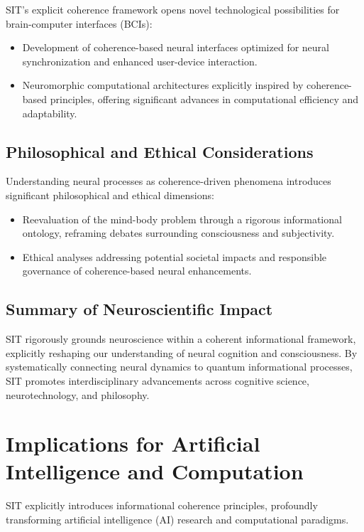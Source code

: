 SIT's explicit coherence framework opens novel technological possibilities for brain-computer interfaces (BCIs):

\begin{itemize}
\item Development of coherence-based neural interfaces optimized for neural synchronization and enhanced user-device interaction.
\item Neuromorphic computational architectures explicitly inspired by coherence-based principles, offering significant advances in computational efficiency and adaptability.
\end{itemize}

\subsection{Philosophical and Ethical Considerations}

Understanding neural processes as coherence-driven phenomena introduces significant philosophical and ethical dimensions:

\begin{itemize}
\item Reevaluation of the mind-body problem through a rigorous informational ontology, reframing debates surrounding consciousness and subjectivity.
\item Ethical analyses addressing potential societal impacts and responsible governance of coherence-based neural enhancements.
\end{itemize}

\subsection{Summary of Neuroscientific Impact}

SIT rigorously grounds neuroscience within a coherent informational framework, explicitly reshaping our understanding of neural cognition and consciousness. By systematically connecting neural dynamics to quantum informational processes, SIT promotes interdisciplinary advancements across cognitive science, neurotechnology, and philosophy.

\section{Implications for Artificial Intelligence and Computation}
\label{sec:ai-computation-implications}

SIT explicitly introduces informational coherence principles, profoundly transforming artificial intelligence (AI) research and computational paradigms.

